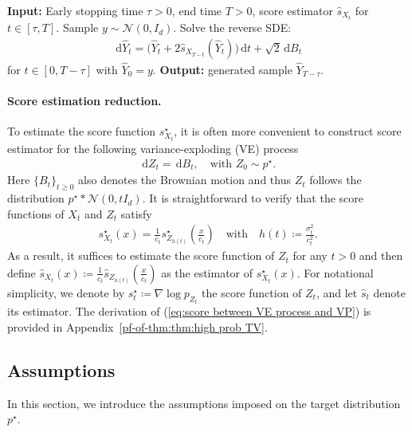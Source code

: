 \documentclass{article}
\newcommand{\defn}{\coloneqq}
\newcommand{\diff}{\,\mathrm{d}}
\theoremstyle{plain}
\theoremstyle{remark}
\begin{document}
\begin{algorithm}[t]
\caption{Sampling procedure}
\label{alg:reverse SDE sampling}
\begin{algorithmic}[1]
\STATE \textbf{Input:} Early stopping time $\tau >0$, end time $T>0$, score estimator $\widehat{s}_{X_t}$ for $t\in [\tau,T]$.
\STATE Sample $ y \sim \mathcal{N}(0,I_d)$.
\STATE Solve the reverse SDE:
\begin{align}
     \diff \widehat{Y}_t = \big(\widehat{Y}_t + 2\widehat{s}_{X_{T-t}}(\widehat{Y}_t)\big) \diff t + \sqrt{2} \diff B_t \label{eq:reverse SDE in alg}
\end{align}
for $t\in [0,T-\tau]$ with $\widehat{Y}_0 = y$.
\STATE \textbf{Output:} generated sample $\widehat{Y}_{T-\tau}$.
\end{algorithmic}    
\end{algorithm}



\paragraph*{Score estimation reduction.}
To estimate the score function $s^\star_{X_t}$, it is often more convenient to construct score estimator for the following variance-exploding (VE) process
\begin{align}
    \diff Z_t = \diff B_t, \quad  \text{with } Z_0 \sim p^\star. \label{eq:VE process}
\end{align}
Here $\{B_t\}_{t\geq 0}$ also denotes the Brownian motion and thus $Z_t$ follows the distribution $p^\star  \ast \mathcal{N}(0,tI_d)$. 
It is straightforward to verify that the score functions of $X_t$ and $Z_t$ satisfy
\begin{align}
    s^\star_{X_t}(x) = \frac{1}{c_t} s^\star_{Z_{h(t)}} (\frac{x}{c_t}) \quad \text{with}\quad h(t)\defn  \frac{\sigma_t^2}{c_t^2}. \label{eq:score between VE process and VP} 
\end{align}
As a result, it suffices to estimate the score function of $Z_t$ for any $t > 0$ and then define $\widehat{s}_{X_t}(x)\defn \frac{1}{c_t} \widehat{s}_{Z_{h(t)}}(\frac{x}{c_t})$ as the estimator of $s^\star_{X_t}(x)$. 
For notational simplicity, we denote by $s_t^\star \defn \nabla \log p_{Z_t}$ the score function of $Z_t$, and let $\widehat{s}_t$ denote its estimator.
The derivation of (\ref{eq:score between VE process and VP}) is provided in Appendix~\ref{pf-of-thm:thm:high prob TV}.




\subsection{Assumptions}
In this section, we introduce the assumptions imposed on the target distribution $p^\star$.
\end{document}
